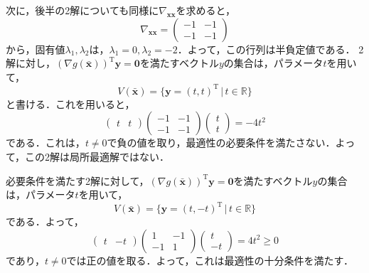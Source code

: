 \documentclass{jsreport}
\begin{document}
次に，後半の2解についても同様に$\nabla_{\bm{xx}}$を求めると，
\begin{equation}
  \nabla_{\bm{xx}} = \left(
  \begin{array}{cc}
    -1 & -1 \\
    -1 & -1
  \end{array}
  \right) \nonumber
\end{equation}
から，固有値$\lambda_1, \lambda_2$は，$\lambda_1 = 0, \lambda_2 = -2$．よって，この行列は半負定値である．
2解に対し，$(\nabla g(\bar{\bm{x}}))^{\mathrm{T}} \bm{y} = \bm{0}$を満たすベクトル$y$の集合は，パラメータ$t$を用いて，
\begin{equation}
  V(\bar{\bm{x}}) = \{\bm{y} = (t, t)^{\mathrm{T}} \, | \, t \in \mathbb{R} \} \nonumber
\end{equation}
と書ける．これを用いると，
\begin{equation}
  \left(
  \begin{array}{cc}
    t & t
  \end{array}
  \right) \left(
  \begin{array}{cc}
    -1 & -1 \\
    -1 & -1
  \end{array}
  \right) \left(
  \begin{array}{c}
    t \\
    t
  \end{array}
  \right) = -4t^2 \nonumber
\end{equation}
である．これは，$t \neq 0$で負の値を取り，最適性の必要条件を満たさない．よって，この2解は局所最適解ではない．

必要条件を満たす2解に対して，$(\nabla g(\bar{\bm{x}}))^{\mathrm{T}} \bm{y} = \bm{0}$を満たすベクトル$y$の集合は，パラメータ$t$を用いて，
\begin{equation}
  V(\bar{\bm{x}}) = \{\bm{y} = (t, -t)^{\mathrm{T}} \, | \, t \in \mathbb{R} \} \nonumber
\end{equation}
である．よって，
\begin{equation}
  \left(
  \begin{array}{cc}
    t & -t
  \end{array}
  \right) \left(
  \begin{array}{cc}
    1 & -1 \\
    -1 & 1
  \end{array}
  \right) \left(
  \begin{array}{c}
    t \\
    -t
  \end{array}
  \right) = 4t^2 \geq 0 \nonumber
\end{equation}
であり，$t \neq 0$では正の値を取る．よって，これは最適性の十分条件を満たす．
\end{document}
